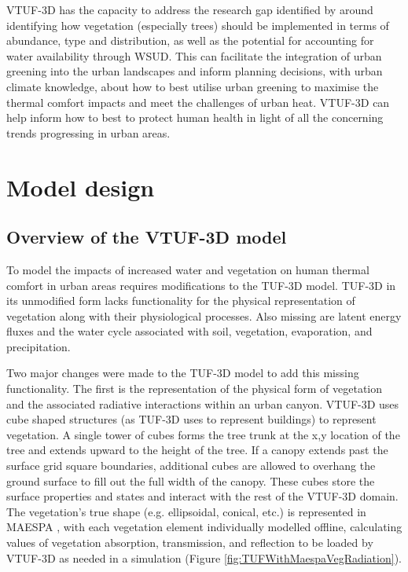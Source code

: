 \documentclass[final,3p,times,authoryear]{elsarticle}
\begin{document}
VTUF-3D has the capacity to address the research gap identified by \cite{Bowler2010} around identifying how vegetation (especially trees) should be implemented in terms of abundance, type and distribution, as well as the potential for accounting for water availability through WSUD. This can facilitate the integration of urban greening into the urban landscapes and inform planning decisions, with urban climate knowledge, about how to best utilise urban greening to maximise the thermal comfort impacts and meet the challenges of urban heat. VTUF-3D can help inform how to best to protect human health in light of all the concerning trends progressing in urban areas.

\section{Model design}\label{sec:method}

\subsection{Overview of the VTUF-3D model}\label{sec:DesignOverview}

To model the impacts of increased water and vegetation on human thermal comfort in urban areas requires modifications to the TUF-3D \citep{Krayenhoff2007} model. TUF-3D in its unmodified form lacks functionality for the physical representation of vegetation along with their physiological processes. Also missing are latent energy fluxes and the water cycle associated with soil, vegetation, evaporation, and precipitation. 

Two major changes were made to the TUF-3D model to add this missing functionality. The first is the representation of the physical form of vegetation and the associated radiative interactions within an urban canyon. VTUF-3D uses cube shaped structures (as TUF-3D uses to represent buildings) to represent vegetation. A single tower of cubes forms the tree trunk at the x,y location of the tree and extends upward to the height of the tree. If a canopy extends past the surface grid square boundaries, additional cubes are allowed to overhang the ground surface to fill out the full width of the canopy. These cubes store the surface properties and states and interact with the rest of the VTUF-3D domain. The vegetation’s true shape (e.g. ellipsoidal, conical, etc.) is represented in MAESPA \citep{Duursma2012}, with each vegetation element individually modelled offline, calculating values of vegetation absorption, transmission, and reflection to be loaded by VTUF-3D as needed in a simulation (Figure \ref{fig:TUFWithMaespaVegRadiation}).
\end{document}
